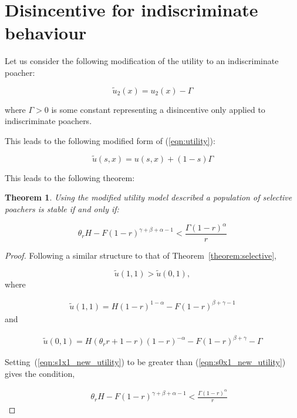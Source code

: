 \documentclass[10pt]{article}
\newtheorem{theorem}{Theorem}
\begin{document}
\section{Disincentive for indiscriminate behaviour}

Let us consider the following modification of the utility to an indiscriminate
poacher:

\begin{equation}
    \label{eqn:modified_utility_for_ind}
    \tilde u_2(x) = u_2(x) - \Gamma
\end{equation}

where \(\Gamma>0\) is some constant representing a disincentive only applied to
indiscriminate poachers.

This leads to the following modified form of (\ref{eqn:utility}):

\begin{equation}
    \label{eqn:modified_utility}
    \tilde u(s, x) = u(s, x) + (1 - s) \Gamma
\end{equation}

This leads to the following theorem:

\begin{theorem}\label{theorem:selective_new_utility}
Using the modified utility model described 
a population of selective poachers is stable if and only if:

\begin{equation}\label{eq:selective_condition_new_utility}
\theta_r H -  F(1 -r) ^{\gamma + \beta + \alpha -1} < \frac{\Gamma (1- r) ^ {\alpha}}{r}
\end{equation}

\end{theorem}

\begin{proof}
    Following a similar structure to that of Theorem~\ref{theorem:selective}, 

    \begin{equation}
    \tilde{u}(1,1) > \tilde{u}(0,1),
    \end{equation}    
    where
    
    \begin{eqnarray}
    \label{eqn:s1x1_new_utility}
    \tilde{u}(1,1) = H(1 - r)^{1 - \alpha} - F(1 - r)^{\beta + \gamma - 1}
    \end{eqnarray}    
    and 
    
    \begin{eqnarray}
    \label{eqn:s0x1_new_utility}
    \tilde{u}(0,1) = H(\theta_r r +1 - r)(1 - r)^{-\alpha} - F(1 - r)^{\beta + \gamma} - \Gamma
    \end{eqnarray}

    Setting~(\ref{eqn:s1x1_new_utility}) to be greater than (\ref{eqn:s0x1_new_utility})
    gives the condition,

    \begin{eqnarray}
    \label{eqn:s1x1_s0x1_new_utility}
    &&\theta_r H -  F(1 -r) ^{\gamma + \beta + \alpha -1} < \frac{\Gamma (1- r) ^ {\alpha}}{r}
    \end{eqnarray} 
\end{proof}
\end{document}
